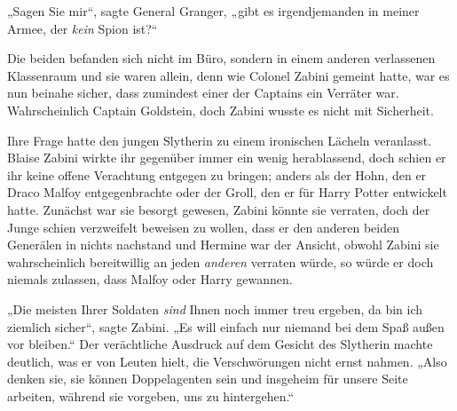 „Sagen Sie mir“, sagte General Granger, „gibt es irgendjemanden in meiner Armee, der \emph{kein} Spion ist?“

Die beiden befanden sich nicht im Büro, sondern in einem anderen verlassenen Klassenraum und sie waren allein, denn wie Colonel Zabini gemeint hatte, war es nun beinahe sicher, dass zumindest einer der Captains ein Verräter war. Wahrscheinlich Captain Goldstein, doch Zabini wusste es nicht mit Sicherheit.

Ihre Frage hatte den jungen Slytherin zu einem ironischen Lächeln veranlasst. Blaise Zabini wirkte ihr gegenüber immer ein wenig herablassend, doch schien er ihr keine offene Verachtung entgegen zu bringen; anders als der Hohn, den er Draco Malfoy entgegenbrachte oder der Groll, den er für Harry Potter entwickelt hatte. Zunächst war sie besorgt gewesen, Zabini könnte sie verraten, doch der Junge schien verzweifelt beweisen zu wollen, dass er den anderen beiden Generälen in nichts nachstand und Hermine war der Ansicht, obwohl Zabini sie wahrscheinlich bereitwillig an jeden \emph{anderen} verraten würde, so würde er doch niemals zulassen, dass Malfoy oder Harry gewannen.

„Die meisten Ihrer Soldaten \emph{sind} Ihnen noch immer treu ergeben, da bin ich ziemlich sicher“, sagte Zabini. „Es will einfach nur niemand bei dem Spaß außen vor bleiben.“ Der verächtliche Ausdruck auf dem Gesicht des Slytherin machte deutlich, was er von Leuten hielt, die Verschwörungen nicht ernst nahmen. „Also denken sie, sie können Doppelagenten sein und insgeheim für unsere Seite arbeiten, während sie vorgeben, uns zu hintergehen.“

